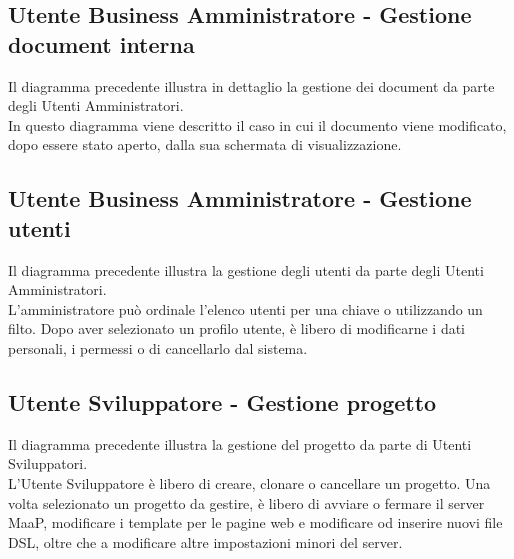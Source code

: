 \subsection{Utente Business Amministratore - Gestione document interna}
Il diagramma precedente illustra in dettaglio la gestione dei document da parte degli Utenti Amministratori.\\
In questo diagramma viene descritto il caso in cui il documento viene modificato, dopo essere stato aperto, dalla sua schermata di visualizzazione.

\subsection{Utente Business Amministratore - Gestione utenti}
Il diagramma precedente illustra la gestione degli utenti da parte degli Utenti Amministratori.\\
L'amministratore può ordinale l'elenco utenti per una chiave o utilizzando un filto. Dopo aver selezionato un profilo utente, è libero di modificarne i dati personali, i permessi o di cancellarlo dal sistema.

\subsection{Utente Sviluppatore - Gestione progetto}
Il diagramma precedente illustra la gestione del progetto da parte di Utenti Sviluppatori.\\
L'Utente Sviluppatore è libero di creare, clonare o cancellare un progetto. Una volta selezionato un progetto da gestire, è libero di avviare o fermare il server MaaP, modificare i template per le pagine web e modificare od inserire nuovi file DSL, oltre che a modificare altre impostazioni minori del server.
